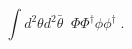 \begin{equation}
\label{eq:superconformal}
\int \!d^2 \theta d^2\bar\theta \;\; \Phi \Phi^\dagger \phi \phi^\dagger \;.
\end{equation}

